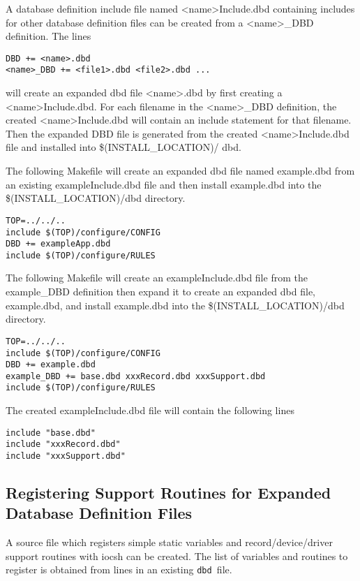 A database definition include file named  \textless{}name\textgreater{}Include.dbd containing includes for other database definition files can 
be created from a \textless{}name\textgreater{}\_DBD definition. The lines

\begin{verbatim}DBD += <name>.dbd
<name>_DBD += <file1>.dbd <file2>.dbd ...
\end{verbatim}will create an expanded dbd file \textless{}name\textgreater{}.dbd by first creating a \textless{}name\textgreater{}Include.dbd. For each filename in the 
\textless{}name\textgreater{}\_DBD definition, the created \textless{}name\textgreater{}Include.dbd will contain an include statement for that filename. Then   the 
expanded DBD file is generated from the created \textless{}name\textgreater{}Include.dbd file and installed into \$(INSTALL\_LOCATION)/
dbd. 

The following Makefile will create an expanded dbd file named example.dbd from an existing exampleInclude.dbd file 
and then install example.dbd into the \$(INSTALL\_LOCATION)/dbd directory.

\begin{verbatim}TOP=../../..
include $(TOP)/configure/CONFIG
DBD += exampleApp.dbd
include $(TOP)/configure/RULES
\end{verbatim}The following Makefile will create an exampleInclude.dbd file from the example\_DBD definition then expand it to create 
an expanded dbd file, example.dbd, and install example.dbd into the \$(INSTALL\_LOCATION)/dbd directory.

\begin{verbatim}TOP=../../..
include $(TOP)/configure/CONFIG
DBD += example.dbd
example_DBD += base.dbd xxxRecord.dbd xxxSupport.dbd
include $(TOP)/configure/RULES
\end{verbatim}The created exampleInclude.dbd file will contain the following lines

\begin{verbatim}include "base.dbd"
include "xxxRecord.dbd"
include "xxxSupport.dbd"
\end{verbatim}\subsection{Registering Support Routines for Expanded Database Definition Files}

A source file which registers simple static variables and record/device/driver support routines with iocsh can be created. 
The list of variables and routines to register is obtained from lines in an existing \verb|dbd |file.

